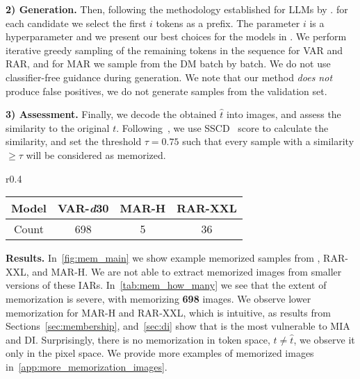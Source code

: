 \textbf{2) Generation.} Then, following the methodology established for LLMs by \citep{carlini2021extractLLM}. for each candidate we select the first $i$ tokens as a prefix. The parameter $i$ is a hyperparameter and we present our best choices for the models in . We perform iterative greedy sampling of the remaining tokens in the sequence for VAR and RAR, and for MAR we sample from the DM batch by batch. We do not use classifier-free guidance during generation. We note that our method \textit{does not} produce false positives, \ie we do not generate samples from the validation set.


\textbf{3) Assessment.} Finally, we decode the obtained $\hat{t}$ into images, and assess the similarity to the original $t$.
Following~\citet{wen2024detecting}, we use SSCD~\citep{pizzi2022self} score to calculate the similarity, and set the threshold $\tau=0.75$ such that every sample with a similarity $\geq\tau$ will be considered as memorized.















\begin{wraptable}{r}{0.4\linewidth} %
    \centering
    \vspace{-5pt}
    \small
    \newcommand{\tightcolsep}{\setlength{\tabcolsep}{2.3pt}} %
    \tightcolsep %
    \caption{\textbf{Count of Extracted Training Samples per IAR.}}
    \vspace{-5pt}
    \begin{tabular}{cccc}
        \toprule
        \textbf{Model} & \textbf{VAR-\textit{d}30} & \textbf{MAR-H} & \textbf{RAR-XXL} \\
        \midrule
        Count & 698 & 5 & 36 \\
        \bottomrule
    \end{tabular}
    \vspace{-5pt}
    \label{tab:mem_how_many}
\end{wraptable}

\textbf{Results.}
In~\cref{fig:mem_main} we show example memorized samples from \varbig, RAR-XXL, and MAR-H. We are not able to extract memorized images from smaller versions of these IARs. In~\cref{tab:mem_how_many} we see that the extent of memorization is severe, with \varbig memorizing \textbf{698} images. We observe lower memorization for MAR-H and RAR-XXL, which is intuitive, as results from Sections~\ref{sec:membership}, and~\ref{sec:di} show that \varbig is the most vulnerable to MIA and DI. Surprisingly, there is no memorization in token space, \ie $t\neq\hat{t}$, we observe it only in the pixel space. 
We provide more examples of memorized images in~\cref{app:more_memorization_images}.






